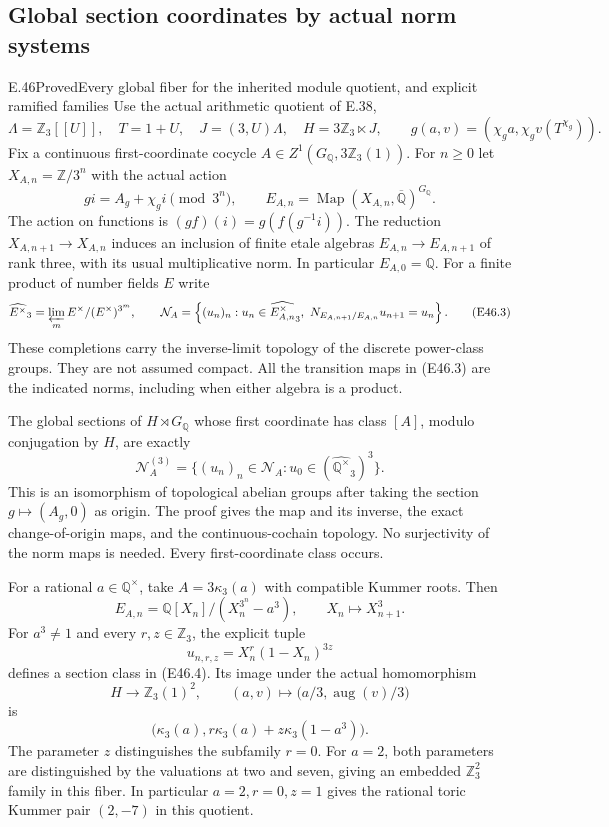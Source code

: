 \subsection{Global section coordinates by actual norm systems}

\begin{statement}{E.46}{Proved}{Every global fiber for the inherited module quotient, and explicit ramified families}
Use the actual arithmetic quotient of E.38,
\[
 \Lambda=\mathbb Z_3[[U]],\quad T=1+U,\quad
 J=(3,U)\Lambda,\quad H=3\mathbb Z_3\ltimes J,
 \qquad
 g(a,v)=(\chi_g a,\chi_gv(T^{\chi_g})).
 \tag{E46.1}
\]
Fix a continuous first-coordinate cocycle
$A\in Z^1(G_{\mathbb Q},3\mathbb Z_3(1))$.
For $n\geq0$ let $X_{A,n}=\mathbb Z/3^n$ with the
actual action
\[
             g i=A_g+\chi_g i\pmod{3^n},
 \qquad
 E_{A,n}=\operatorname{Map}(X_{A,n},\overline{\mathbb Q})^{G_{\mathbb Q}}.
 \tag{E46.2}
\]
The action on functions is $(g f)(i)=g(f(g^{-1}i))$.
The reduction $X_{A,n+1}\to X_{A,n}$ induces an
inclusion of finite etale algebras $E_{A,n}\to E_{A,n+1}$
of rank three, with its usual multiplicative norm.
In particular $E_{A,0}=\mathbb Q$.
For a finite product of number fields $E$ write
\[
 \widehat{E^\times}_3
    =\varprojlim_m E^\times/(E^\times)^{3^m},
 \qquad
 \mathcal N_A=
  \left\{(u_n)_n:
    u_n\in\widehat{E_{A,n}^\times}_3,
    \ N_{E_{A,n+1}/E_{A,n}}u_{n+1}=u_n\right\}.
 \tag{E46.3}
\]
These completions carry the inverse-limit topology of
the discrete power-class groups. They are not assumed
compact. All the transition maps in (E46.3) are the
indicated norms, including when either algebra is a
product.

The global sections of $H\rtimes G_{\mathbb Q}$ whose
first coordinate has class $[A]$, modulo conjugation
by $H$, are exactly
\[
 \boxed{\quad
  \mathcal N_A^{(3)}=
  \{(u_n)_n\in\mathcal N_A:
             u_0\in(\widehat{\mathbb Q^\times}_3)^3\}.
 \quad}                                                    \tag{E46.4}
\]
This is an isomorphism of topological abelian groups
after taking the section $g\mapsto(A_g,0)$ as origin.
The proof gives the map and its inverse, the exact
change-of-origin maps, and the continuous-cochain
topology. No surjectivity of the norm maps is needed.
Every first-coordinate class occurs.

For a rational $a\in\mathbb Q^\times$, take
$A=3\kappa_3(a)$ with compatible Kummer roots. Then
\[
 E_{A,n}=\mathbb Q[X_n]/(X_n^{3^n}-a^3),
 \qquad X_n\longmapsto X_{n+1}^3.                    \tag{E46.5}
\]
For $a^3\ne1$ and every $r,z\in\mathbb Z_3$, the explicit
tuple
\[
                 u_{n,r,z}=X_n^r(1-X_n)^{3z}        \tag{E46.6}
\]
defines a section class in (E46.4). Its image under the
actual homomorphism
\[
 H\longrightarrow\mathbb Z_3(1)^2,
 \qquad(a,v)\longmapsto
       \bigl(a/3,\operatorname{aug}(v)/3\bigr)
 \tag{E46.7}
\]
is
\[
             \bigl(\kappa_3(a),
                       r\kappa_3(a)+z\kappa_3(1-a^3)\bigr).
 \tag{E46.8}
\]
The parameter $z$ distinguishes the subfamily $r=0$.
For $a=2$, both parameters are distinguished by the
valuations at two and seven, giving an embedded
$\mathbb Z_3^2$ family in this fiber. In particular
$a=2,r=0,z=1$ gives the rational toric Kummer pair
$(2,-7)$ in this quotient.


\end{statement}
